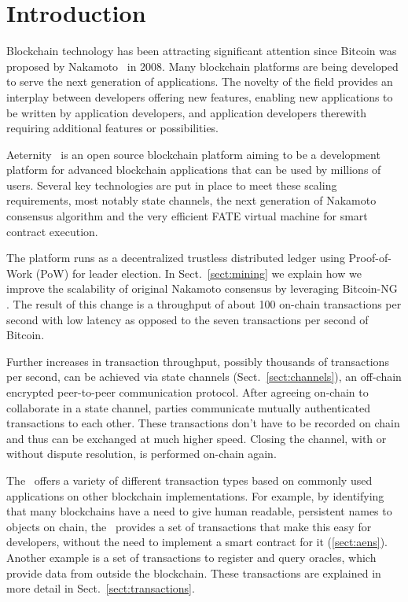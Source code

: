 \section{Introduction}

Blockchain technology has been attracting significant attention since Bitcoin
was proposed by Nakamoto~\cite{SN} in 2008.
Many blockchain platforms are being developed to serve the next generation of
applications. The novelty of the field provides an interplay between developers
offering new features, enabling new applications to be written by application
developers, and application developers therewith requiring additional features
or possibilities.

Aeternity~\cite{AE,UlfWigerCodeMesh2018} is an open source blockchain
platform aiming to be a development platform for advanced blockchain
applications that can be used by millions of users. Several key technologies
are put in place to meet these scaling requirements, most notably state
channels, the next generation of Nakamoto consensus algorithm and the very
efficient FATE virtual machine for smart contract execution.

The platform runs as a decentralized trustless distributed ledger using
Proof-of-Work (PoW) \cite{dwork1992pricing,back1997hashcash,Tromp2015CuckooCA}
for leader election.
In Sect.~\ref{sect:mining} we explain how we improve the scalability of
original Nakamoto consensus \cite{SN} by leveraging Bitcoin-NG
\cite{Eyal:2016:BSB:2930611.2930615}. The result of this change
is a throughput of about 100 on-chain transactions per second with
low latency as opposed to the seven transactions per second of Bitcoin.

Further increases in transaction throughput, possibly thousands of 
transactions per second, can be achieved via state channels (Sect.\
\ref{sect:channels}),
an off-chain encrypted peer-to-peer communication protocol. After
agreeing on-chain to collaborate in a state channel, parties communicate
mutually authenticated transactions to each other. These transactions don't
have to be recorded on chain and thus can be exchanged at much higher
speed. Closing the channel, with or without dispute resolution, is performed
on-chain again.

The \blockchain\ offers a variety of different transaction types
based on commonly used applications on other blockchain implementations.
For example, by identifying that many blockchains have a need to give human
readable, persistent names to objects on chain, the \blockchain\ provides a
set of transactions that make this easy for developers, without the need to
implement a smart contract for it (\ref{sect:aens}). Another example is a set
of transactions to register and query oracles, which provide data from outside
the blockchain.
These transactions are explained in more detail in Sect.\
\ref{sect:transactions}.

